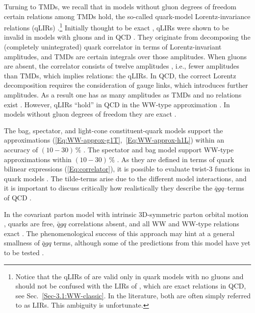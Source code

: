 \documentclass[a4paper,11pt]{article}
\begin{document}
Turning to TMDs, we recall that in models without gluon
degrees of freedom certain relations among TMDs hold, the
so-called quark-model Lorentz-invariance relations (qLIRs)
\cite{Tangerman:1994bb,Mulders:1995dh}.\footnote{Notice that
	the qLIRs of \cite{Tangerman:1994bb,Mulders:1995dh} are
	valid only in quark models with no gluons and should not
	be confused with the LIRs of \cite{Kanazawa:2015ajw}, which
	are exact relations in QCD, see Sec.~\ref{Sec-3.1:WW-classic}.
	In the literature, both are often simply referred to as LIRs.
	This ambiguity is unfortunate.}
Initially thought to be exact \cite{Tangerman:1994bb,Mulders:1995dh},
qLIRs were shown  to be invalid in models with gluons
\cite{Kundu:2001pk,Schlegel:2004rg} and in QCD \cite{Goeke:2003az}.
They originate from decomposing the (completely unintegrated)
quark correlator in terms of Lorentz-invariant amplitudes, and
TMDs are certain integrals over those amplitudes.
When gluons are absent, the correlator consists
of twelve amplitudes \cite{Tangerman:1994bb,Mulders:1995dh}, i.e., fewer
amplitudes than TMDs, which implies relations: the qLIRs.
In QCD, the correct Lorentz decomposition requires the consideration of
gauge links, which introduces further amplitudes. As a result one has
as many amplitudes as TMDs and no relations exist \cite{Goeke:2003az}.
However, qLIRs ``hold'' in QCD in the WW-type approximation
\cite{Metz:2008ib}. In models without gluon degrees of freedom
they are exact
\cite{Metz:2008ib,Teckentrup:2009tk,Avakian:2010br,Jakob:1997wg}.

The bag, spectator, and light-cone constituent-quark models support
the approximations (\ref{Eq:WW-approx-g1T},~\ref{Eq:WW-approx-h1L})
within an accuracy of $(10-30)\,\%$
\cite{Jakob:1997wg,Pasquini:2008ax,Avakian:2010br,Lorce:2011dv}.
The spectator and bag model support WW-type approximations
within $(10-30)\,\%$ \cite{Avakian:2010br}.
As they are defined in terms of quark bilinear expressions
(\ref{Eq:correlator}), it is possible to evaluate twist-3 functions
in quark models \cite{Jaffe:1991ra}. The tilde-terms arise due to
the different model interactions, and it is important to discuss
critically how realistically they describe the $\bar{q}gq$--terms
of QCD \cite{Lorce:2014hxa,Lorce:2016ugb}.

In the covariant parton model with intrinsic 3D-symmetric parton
orbital motion \cite{Zavada:1996kp}, quarks are free, $\bar{q}gq$
correlations absent, and all WW and WW-type relations exact
\cite{Efremov:2010mt,Efremov:2009ze}.
The phenomenological success of this approach \cite{Zavada:1996kp} may
hint at a general smallness of $\bar{q}gq$ terms, although some of the
predictions from this model have yet to be tested \cite{Efremov:2010mt}.
\end{document}
